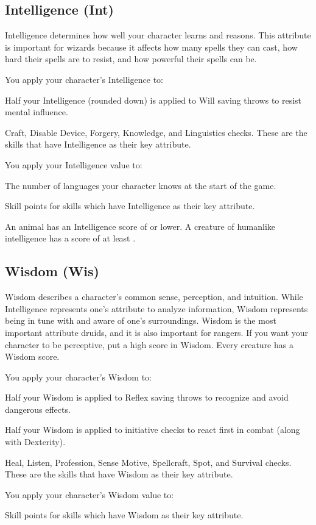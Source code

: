 \subsection{Intelligence (Int)}
Intelligence determines how well your character learns and reasons. This attribute is important for wizards because it affects how many spells they can cast, how hard their spells are to resist, and how powerful their spells can be.

You apply your character's Intelligence to:
\begin{itemize*}
\item Half your Intelligence (rounded down) is applied to Will saving throws to resist mental influence.
\item Craft, Disable Device, Forgery, Knowledge, and Linguistics checks. These are the skills that have Intelligence as their key attribute.
\end{itemize*}

\par You apply your Intelligence value to:
\begin{itemize*}
\item The number of languages your character knows at the start of the game.
\item Skill points for skills which have Intelligence as their key attribute.
\end{itemize*}

\par An animal has an Intelligence score of  or lower. A creature of humanlike intelligence has a score of at least .

\subsection{Wisdom (Wis)}
Wisdom describes a character's common sense, perception, and intuition. While Intelligence represents one's attribute to analyze information, Wisdom represents being in tune with and aware of one's surroundings. Wisdom is the most important attribute druids, and it is also important for rangers. If you want your character to be perceptive, put a high score in Wisdom. Every creature has a Wisdom score.

You apply your character's Wisdom to:
\begin{itemize*}
\item Half your Wisdom is applied to Reflex saving throws to recognize and avoid dangerous effects.
\item Half your Wisdom is applied to initiative checks to react first in combat (along with Dexterity).
\item Heal, Listen, Profession, Sense Motive, Spellcraft, Spot, and Survival checks. These are the skills that have Wisdom as their key attribute.
\end{itemize*}
You apply your character's Wisdom value to:
\begin{itemize*}
\item Skill points for skills which have Wisdom as their key attribute.
\end{itemize*}

